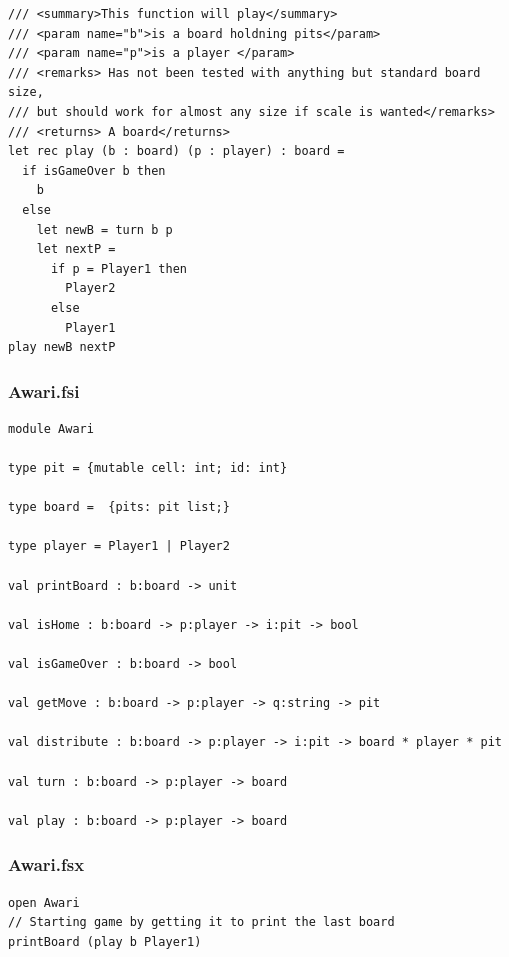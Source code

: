 \documentclass{article}
\begin{document}
\begin{lstlisting}[frame=single]
/// <summary>This function will play</summary>
/// <param name="b">is a board holdning pits</param>
/// <param name="p">is a player </param>
/// <remarks> Has not been tested with anything but standard board size, 
/// but should work for almost any size if scale is wanted</remarks>
/// <returns> A board</returns>
let rec play (b : board) (p : player) : board =
  if isGameOver b then
    b
  else
    let newB = turn b p
    let nextP =
      if p = Player1 then
        Player2
      else
        Player1
play newB nextP
\end{lstlisting}

\subsubsection{Awari.fsi}
\lstset{language=FSharp,numbers=left,stepnumber=1}
\begin{lstlisting}[frame=single]
module Awari

type pit = {mutable cell: int; id: int}

type board =  {pits: pit list;}

type player = Player1 | Player2

val printBoard : b:board -> unit

val isHome : b:board -> p:player -> i:pit -> bool

val isGameOver : b:board -> bool

val getMove : b:board -> p:player -> q:string -> pit

val distribute : b:board -> p:player -> i:pit -> board * player * pit

val turn : b:board -> p:player -> board

val play : b:board -> p:player -> board
\end{lstlisting}
\subsubsection{Awari.fsx}
\lstset{language=FSharp,numbers=left,stepnumber=1}
\begin{lstlisting}[frame=single]
open Awari
// Starting game by getting it to print the last board
printBoard (play b Player1)
\end{lstlisting}
\end{document}
